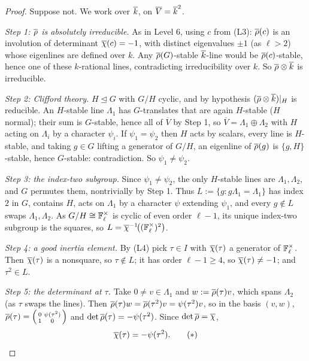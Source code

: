 \documentclass[11pt]{article}
\begin{document}
\begin{proof}
Suppose not. We work over $\overline{k}$, on $\overline V=\overline{k}^2$.

\emph{Step 1: $\overline{\rho}$ is absolutely irreducible.} As in Level 6, using
$c$ from (L3): $\overline{\rho}(c)$ is an involution of determinant $\overline{\chi}(c)=-1$,
with distinct eigenvalues $\pm1$ (as $\ell>2$) whose eigenlines are defined
over $k$. Any $\overline{\rho}(G)$-stable $\overline{k}$-line would be $\overline{\rho}(c)$-stable,
hence one of these $k$-rational lines, contradicting irreducibility over $k$.
So $\overline{\rho}\otimes\overline{k}$ is irreducible.

\emph{Step 2: Clifford theory.} $H\trianglelefteq G$ with $G/H$ cyclic, and by
hypothesis $(\overline{\rho}\otimes\overline{k})|_H$ is reducible. An $H$-stable line
$\Lambda_1$ has $G$-translates that are again $H$-stable ($H$ normal); their sum
is $G$-stable, hence all of $\overline V$ by Step 1, so
$\overline V=\Lambda_1\oplus\Lambda_2$ with $H$ acting on $\Lambda_i$ by a
character $\psi_i$. If $\psi_1=\psi_2$ then $H$ acts by scalars, every line is
$H$-stable, and taking $g\in G$ lifting a generator of $G/H$, an eigenline of
$\overline{\rho}(g)$ is $\{g,H\}$-stable, hence $G$-stable: contradiction. So
$\psi_1\neq\psi_2$.

\emph{Step 3: the index-two subgroup.} Since $\psi_1\neq\psi_2$, the only
$H$-stable lines are $\Lambda_1,\Lambda_2$, and $G$ permutes them, nontrivially
by Step 1. Thus $L:=\{g:g\Lambda_1=\Lambda_1\}$ has index $2$ in $G$, contains
$H$, acts on $\Lambda_1$ by a character $\psi$ extending $\psi_1$, and every
$g\notin L$ swaps $\Lambda_1,\Lambda_2$. As $G/H\cong\mathbb{F}_\ell^\times$ is cyclic of
even order $\ell-1$, its unique index-two subgroup is the squares, so
$L=\overline{\chi}^{-1}\!\bigl((\mathbb{F}_\ell^\times)^2\bigr)$.

\emph{Step 4: a good inertia element.} By (L4) pick $\tau\in I$ with
$\overline{\chi}(\tau)$ a generator of $\mathbb{F}_\ell^\times$. Then $\overline{\chi}(\tau)$ is a nonsquare,
so $\tau\notin L$; it has order $\ell-1\geq4$, so $\overline{\chi}(\tau)\neq-1$; and
$\tau^2\in L$.

\emph{Step 5: the determinant at $\tau$.} Take $0\neq v\in\Lambda_1$ and
$w:=\overline{\rho}(\tau)v$, which spans $\Lambda_2$ (as $\tau$ swaps the lines). Then
$\overline{\rho}(\tau)w=\overline{\rho}(\tau^2)v=\psi(\tau^2)v$, so in the basis $(v,w)$,
$\overline{\rho}(\tau)=\left(\begin{smallmatrix}0&\psi(\tau^2)\\1&0\end{smallmatrix}\right)$
and $\det\overline{\rho}(\tau)=-\psi(\tau^2)$. Since $\det\overline{\rho}=\overline{\chi}$,
\[
  \overline{\chi}(\tau)=-\psi(\tau^2). \qquad(*)
\]


\end{proof}
\end{document}
